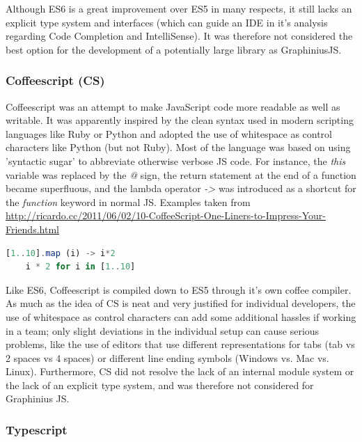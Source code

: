 		Although ES6 is a great improvement over ES5 in many respects, it still lacks an explicit type system and interfaces (which can guide an IDE in it's analysis regarding Code Completion and IntelliSense). It was therefore not considered the best option for the development of a potentially large library as GraphiniusJS.			
		
		\subsubsection{Coffeescript (CS)}
		\label{sssect:coffeescript}
		
		Coffeescript was an attempt to make JavaScript code more readable as well as writable. It was apparently inspired by the clean syntax used in modern scripting languages like Ruby or Python and adopted the use of whitespace as control characters like Python (but not Ruby). Most of the language was based on using 'syntactic sugar' to abbreviate otherwise verbose JS code. For instance, the  \textit{this} variable was replaced by the  \textit{@} sign, the return statement at the end of a function became superfluous, and the lambda operator \textit{->} was introduced as a shortcut for the \textit{function} keyword in normal JS. Examples taken from \url{http://ricardo.cc/2011/06/02/10-CoffeeScript-One-Liners-to-Impress-Your-Friends.html}
		
		\begin{lstlisting}[caption={Two versions of the same mapping functionality in CoffeeScript}, label={fig:Coffeescript_mapping}, language=JavaScript]
	[1..10].map (i) -> i*2
	i * 2 for i in [1..10]
		\end{lstlisting}
		
		Like ES6, Coffeescript is compiled down to ES5 through it's own coffee compiler. As much as the idea of CS is neat and very justified for individual developers, the use of whitespace as control characters can add some additional hassles if working in a team; only slight deviations in the individual setup can cause serious problems, like the use of editors that use different representations for tabs (tab vs 2 spaces vs 4 spaces) or different line ending symbols (Windows vs. Mac vs. Linux). Furthermore, CS did not resolve the lack of an internal module system or the lack of an explicit type system, and was therefore not considered for Graphinius JS.
		
		
		\subsubsection{Typescript}
		\label{sssect:typescript}
		
